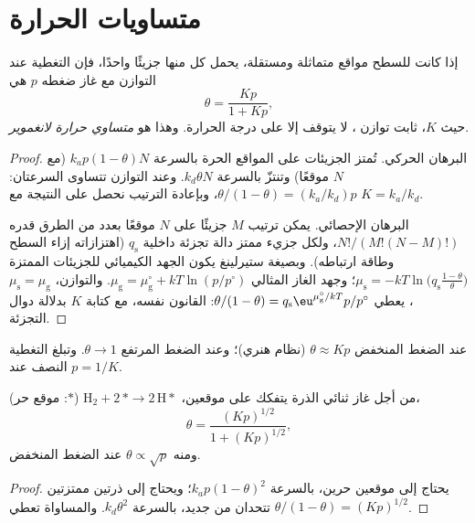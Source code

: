 \section{متساويات الحرارة}

\begin{theorem}\label{thm:b3:surfaces-catalysis:langmuir}
إذا كانت للسطح مواقع متماثلة ومستقلة، يحمل كل منها جزيئًا واحدًا، فإن
التغطية عند التوازن مع غاز ضغطه $p$ هي
\[
  \theta = \frac{Kp}{1 + Kp},
\]
حيث $K$، ثابت توازن ، لا يتوقف إلا على
درجة الحرارة. وهذا هو \emph{متساوي حرارة لانغموير}.
\end{theorem}

\begin{proof}
البرهان الحركي. تُمتز الجزيئات على المواقع الحرة بالسرعة $k_ap(1 - \theta)N$ (مع $N$
موقعًا) وتنتزّ بالسرعة $k_d\theta N$. وعند التوازن تتساوى السرعتان: $\theta/(1 - \theta)
= (k_a/k_d)p$، وبإعادة الترتيب نحصل على النتيجة مع $K = k_a/k_d$.

البرهان الإحصائي. يمكن ترتيب $M$ جزيئًا على $N$ موقعًا بعدد من الطرق قدره $N!/(M!(N - M)!)$،
ولكل جزيء ممتز دالة تجزئة داخلية $q_{\mathrm s}$ (اهتزازاته
إزاء السطح وطاقة ارتباطه). وبصيغة ستيرلينغ
يكون الجهد الكيميائي للجزيئات الممتزة $\mu_{\mathrm s} = -kT\ln\bigl(q_{\mathrm s}\frac{1 - \theta}{\theta}\bigr)$؛
وجهد الغاز المثالي $\mu_{\mathrm g} = \mu_{\mathrm g}^\circ + kT\ln(p/p^\circ)$. والتوازن، $\mu_{\mathrm s} = \mu_{\mathrm g}$، يعطي
$\theta/(1 - \theta) = q_{\mathrm s}\eu^{\mu_{\mathrm g}^\circ/kT}p/p^\circ$: القانون نفسه، مع كتابة $K$ بدلالة
دوال التجزئة.
\end{proof}

عند الضغط المنخفض $\theta \approx Kp$ (نظام هنري)؛ وعند الضغط المرتفع $\theta \to 1$. 
وتبلغ التغطية النصف عند $p = 1/K$.

\begin{proposition}\label{prop:b3:surfaces-catalysis:dissociative}
من أجل غاز ثنائي الذرة يتفكك على موقعين، $\mathrm{H_2} + 2\,{*} \to 2\,\mathrm{H}{*}$ (${*}$: موقع حر)،
\[
  \theta = \frac{(Kp)^{1/2}}{1 + (Kp)^{1/2}},
\]
ومنه $\theta \propto \sqrt p$ عند الضغط المنخفض.
\end{proposition}

\begin{proof}
يحتاج  إلى موقعين حرين، بالسرعة $k_ap(1 - \theta)^2$؛ ويحتاج  إلى ذرتين
ممتزتين تتحدان من جديد، بالسرعة $k_d\theta^2$. والمساواة تعطي $\theta/(1 - \theta) =
(Kp)^{1/2}$.
\end{proof}

